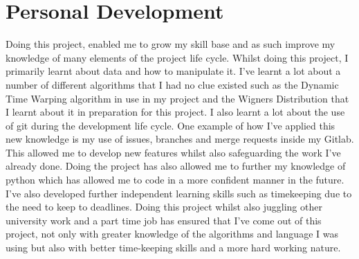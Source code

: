 \documentclass[10pt,a4paper]{report}
\begin{document}
\section{Personal Development}

Doing this project, enabled me to grow my skill base and as such improve my knowledge of many elements of the project life cycle. Whilst doing this project, I primarily learnt about data and how to manipulate it. I've learnt a lot about a number of different algorithms that I had no clue existed such as the Dynamic Time Warping algorithm in use in my project and the Wigners Distribution that I learnt about it in preparation for this project. I also learnt a lot about the use of git during the development life cycle. One example of how I've applied this new knowledge is my use of issues, branches and merge requests inside my Gitlab. This allowed me to develop new features whilst also safeguarding the work I've already done. Doing the project has also allowed me to further my knowledge of python which has allowed me to code in a more confident manner in the future. I've also developed further independent learning skills such as timekeeping due to the need to keep to deadlines. Doing this project whilst also juggling other university work and a part time job has ensured that I've come out of this project, not only with greater knowledge of   the algorithms and language I was using but also with better time-keeping skills and a more hard working nature.
\end{document}
